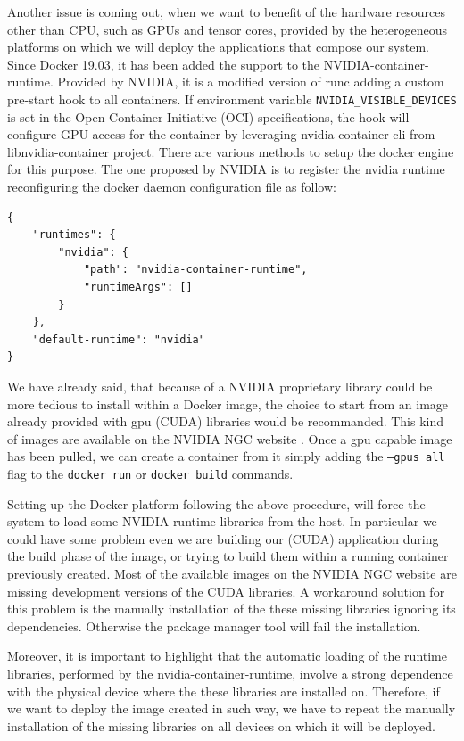 Another issue is coming out, when we want to benefit of the hardware resources other than CPU, such as GPUs and tensor cores, provided by the heterogeneous platforms on which we will deploy the applications that compose our system.
Since Docker 19.03, it has been added the support to the NVIDIA-container-runtime. Provided by NVIDIA, it is a modified version of runc adding a custom pre-start hook to all containers.
If environment variable \texttt{NVIDIA_VISIBLE_DEVICES} is set in the Open Container Initiative (OCI) specifications, the hook will configure GPU access for the container by leveraging nvidia-container-cli from libnvidia-container project.
There are various methods to setup the docker engine for this purpose. The one proposed by NVIDIA is to register the nvidia runtime reconfiguring the docker daemon configuration file as follow:
\begin{verbatim}
{
	"runtimes": {
		"nvidia": {
			"path": "nvidia-container-runtime",
			"runtimeArgs": []
		}
	},
	"default-runtime": "nvidia"
}
\end{verbatim}

We have already said, that because of a NVIDIA proprietary library could be more tedious to install within a Docker image, the choice to start from an image already provided with gpu (CUDA) libraries would be recommanded. This kind of images are available on the NVIDIA NGC website \cite{nvidiangc}. Once a gpu capable image has been pulled, we can create a container from it simply adding the \texttt{--gpus all} flag to the \texttt{docker run} or \texttt{docker build} commands.

Setting up the Docker platform following the above procedure, will force the system to load some NVIDIA runtime libraries from the host. 
In particular we could have some problem even we are building our (CUDA) application during the build phase of the image, or trying to build them within a running container previously created. 
Most of the available images on the NVIDIA NGC website are missing development versions of the CUDA libraries. A workaround solution for this problem is the manually installation of the these missing libraries ignoring its dependencies. Otherwise the package manager tool will fail the installation.

Moreover, it is important to highlight that the automatic loading of the runtime libraries, performed by the nvidia-container-runtime, involve a strong dependence with the physical device where the these libraries are installed on. Therefore, if we want to deploy the image created in such way, we have to repeat the manually installation of the missing libraries on all devices on which it will be deployed.



